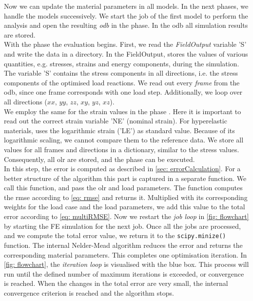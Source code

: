 Now we can update the material parameters in all models. In the next phases, we handle the models successively.
We start the job of the first model to perform the  analysis and open the resulting \emph{\acrfull{odb}} in the  phase. In the \acrshort{odb} all simulation results are stored.\\
\indent With the phase  the evaluation begins. First, we read the \emph{FieldOutput} variable 'S' and write the data in a directory. In the FieldOutput,  stores the values of various quantities, e.g. stresses, strains and energy components, during the simulation.
The variable 'S' contains the stress components in all directions, i.e. the stress components of the optimised load reactions.
We read out every \emph{frame} from the \acrshort{odb}, since one frame corresponds with one load step.
Additionally, we loop over all directions ($xx$, $yy$, $zz$, $xy$, $yz$, $xz$). \\
\indent We employ the same for the strain values in the phase .
Here it is important to read out the correct strain variable 'NE' (nominal strain).
For hyperelastic materials,  uses the logarithmic strain ('LE') as standard value. Because of its logarithmic scaling, we cannot compare them to the reference data. We store all values for all frames and directions in a dictionary, similar to the stress values.
Consequently, all \acrlong{olr} are stored, and the phase  can be executed. \\
\indent In this step, the error is computed as described in \autoref{sec: errorCalculation}.
For a better structure of the algorithm this part is captured in a separate function.
We call this function, and pass the \acrlong{olr} and load parameters.
The function computes the \acrshort{rmse} according to \autoref{eq: rmse} and returns it.
Multiplied with its corresponding weights for the load case and the load parameters, we add this value to the total error according to \autoref{eq: multiRMSE}.
Now we restart the \emph{job loop} in \autoref{fig: flowchart} by starting the FE simulation for the next job.
Once all the jobs are processed, and we compute the total error value, we return it to the \verb|scipy.minize()| function.
The internal Nelder-Mead algorithm reduces the error and returns the corresponding material parameters.
This completes one optimisation iteration. In \autoref{fig: flowchart}, the \emph{iteration loop} is visualised with the blue box.
This process will run until the defined number of maximum iterations is exceeded, or convergence is reached. When the changes in the total error are very small, the internal convergence criterion is reached and the algorithm stops.


